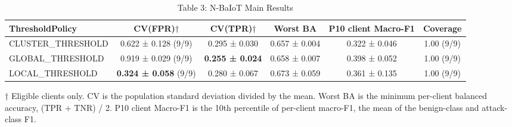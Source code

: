 \begin{table}[htbp]
\caption{Table 3: N-BaIoT Main Results}
\centering
\begin{tabular}{l c c c c c}
\toprule
ThresholdPolicy & CV(FPR)$\dagger$ & CV(TPR)$\dagger$ & Worst BA & P10 client Macro-F1 & Coverage \\
\midrule
CLUSTER_THRESHOLD & 0.622 ± 0.128 (9/9) & 0.295 ± 0.030 & 0.657 ± 0.004 & 0.322 ± 0.046 & 1.00 (9/9) \\
GLOBAL_THRESHOLD & 0.919 ± 0.029 (9/9) & \textbf{0.255 ± 0.024} & 0.658 ± 0.007 & 0.398 ± 0.052 & 1.00 (9/9) \\
LOCAL_THRESHOLD & \textbf{0.324 ± 0.058} (9/9) & 0.280 ± 0.067 & 0.673 ± 0.059 & 0.361 ± 0.135 & 1.00 (9/9) \\
\bottomrule
\end{tabular}

\footnotesize{† Eligible clients only. CV is the population standard deviation divided by the mean. Worst BA is the minimum per-client balanced accuracy, (TPR + TNR) / 2. P10 client Macro-F1 is the 10th percentile of per-client macro-F1, the mean of the benign-class and attack-class F1.}
\end{table}